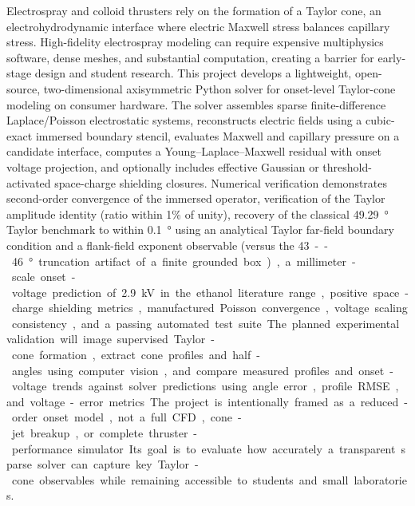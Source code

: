 Electrospray and colloid thrusters rely on the formation of a Taylor cone, an electrohydrodynamic interface where electric Maxwell stress balances capillary stress. High-fidelity electrospray modeling can require expensive multiphysics software, dense meshes, and substantial computation, creating a barrier for early-stage design and student research. This project develops a lightweight, open-source, two-dimensional axisymmetric Python solver for onset-level Taylor-cone modeling on consumer hardware. The solver assembles sparse finite-difference Laplace/Poisson electrostatic systems, reconstructs electric fields using a cubic-exact immersed boundary stencil, evaluates Maxwell and capillary pressure on a candidate interface, computes a Young--Laplace--Maxwell residual with onset voltage projection, and optionally includes effective Gaussian or threshold-activated space-charge shielding closures. Numerical verification demonstrates second-order convergence of the immersed operator, verification of the Taylor amplitude identity (ratio within 1\% of unity), recovery of the classical \SI{49.29}{\degree} Taylor benchmark to within \SI{0.1}{\degree} using an analytical Taylor far-field boundary condition and a flank-field exponent observable (versus the \SI{43}--\SI{46}{\degree} truncation artifact of a finite grounded box), a millimeter-scale onset-voltage prediction of \SI{2.9}{\kV} in the ethanol literature range, positive space-charge shielding metrics, manufactured Poisson convergence, voltage scaling consistency, and a passing automated test suite. The planned experimental validation will image supervised Taylor-cone formation, extract cone profiles and half-angles using computer vision, and compare measured profiles and onset-voltage trends against solver predictions using angle error, profile RMSE, and voltage-error metrics. The project is intentionally framed as a reduced-order onset model, not a full CFD, cone-jet breakup, or complete thruster-performance simulator. Its goal is to evaluate how accurately a transparent sparse solver can capture key Taylor-cone observables while remaining accessible to students and small laboratories.

